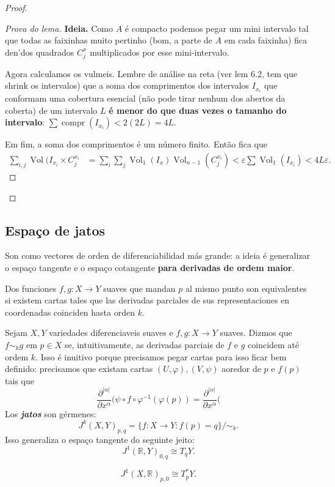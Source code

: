 \begin{proof}
\begin{enumerate}[label=\textbf{Passo \arabic*}]
\begin{proof}[Prova do lema]
	{\color{4}\bfseries Ideia.}\hspace{.5em} Como \(A\) é compacto podemos pegar um mini intervalo tal que todas as faixinhas muito pertinho (bom, a parte de \(A\) em cada faixinha) fica den'dos quadrados \(C^x_j\) multiplicados por esse mini-intervalo.

	Agora calculamos os vulmeis. Lembre de análise na reta (ver \cite{lee} lem 6.2, tem que shrink os intervalos) que a soma dos comprimentos dos intervalos \(I_{x_i}\) que conformam uma cobertura esencial (não pode tirar nenhum dos abertos da coberta) de um intervalo \(L\) \textbf{é menor do que duas vezes o tamanho do intervalo}:  \(\sum \operatorname{compr}(I_{x_i})< 2(2L)=4L\).

	Em fim, a soma dos comprimentos é um número finito. Então fica que
	\begin{align*}
	\sum_{i,j}\operatorname{Vol}(I_{x_i} \times C_j^{x_i}&= \sum_i \sum_j \operatorname{Vol}_1(I_x) \operatorname{Vol}_{n-1}(C_j^{x_i})<\varepsilon \sum \operatorname{Vol}_1(I_{x_i}) < 4L\varepsilon.
	\end{align*}
	\end{proof}
\end{enumerate}
\end{proof}

\subsection{Espaço de jatos}

Son como vectores de orden de diferenciabilidad más grande: a ideia é generalizar o espaço tangente e o espaço cotangente \textbf{para derivadas de ordem maior}.

\begin{defn}\leavevmode

	Dos funciones \(f,g:X\to Y\) suaves que mandan \(p\) al mismo punto son equivalentes si existem cartas tales que las derivadas parciales de sus representaciones en coordenadas coinciden hasta orden \(k\).
\end{defn}

Sejam \(X, Y\) variedades diferenciaveis suaves e \(f,g:X \to Y\) suaves. Dizmos que \(f \sim_k g\) em \(p \in X\) se, intuitivamente, as derivadas parciais de \(f \) e \(g\) coincidem até ordem $k$. Isso é inuitivo porque precisamos pegar cartas para isso ficar bem definido: precisamos que existam cartas \((U, \varphi),(V,\psi)\) aoredor de \(p\) e \(f(p)\) tais que
\[\frac{\partial ^{|\alpha|}}{\partial x^\alpha}(\psi \circ f \circ \varphi^{-1}(\varphi(p))=\frac{\partial ^{| \alpha|}}{\partial x^\alpha}(\]
Los \textit{\textbf{jatos}} son gérmenes:
\[J^k(X,Y)_{p,q}=\{f:X \to Y: f(p)=q\}\Big/ \sim_k.\]
Isso generaliza o espaço tangente do seguinte jeito:
\[J^1(\mathbb{R},Y)_{0,q} \cong T_qY.\]
\begin{exercise}\leavevmode
\[J^1(X,\mathbb{R})_{p,0}\cong T_p^*Y.\]
\end{exercise}

